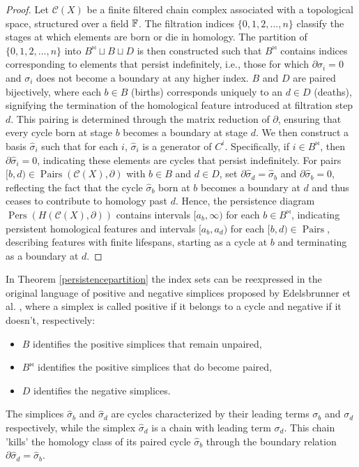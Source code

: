 \begin{proof}
	Let $\mathcal{C}(X)$ be a finite filtered chain complex associated with
	a topological space, structured over a field ${\mathbb{F}}$. The filtration indices $\{0, 1, 2, \ldots, n\}$
	classify the stages at which elements are born or die in homology. The
	partition of $\{0, 1, 2, \ldots, n\}$ into $B^{\Join} \sqcup B \sqcup D$ is then constructed such that $B^{\Join}$ contains indices corresponding to elements that persist indefinitely, i.e., those for which $\partial\sigma_{i} = 0$ and $\sigma_{i}$ does not become a boundary at any higher index. $B$ and $D$ are paired bijectively, where each $b \in B$ (births) corresponds uniquely to an $d \in D$ (deaths), signifying the termination of the homological feature introduced at filtration step $d$. This pairing is determined through the matrix reduction of $\partial$, ensuring that every cycle born at stage $b$ becomes a boundary at stage $d$. We then construct a basis ${\hat{\sigma}_i}$ such that for each $i$, $\hat{\sigma}_{i}$ is a generator of $C^i$. Specifically, if $i \in B^{\Join}$, then
	$\partial\hat{\sigma}_{i} = 0$, indicating these elements are cycles that persist
	indefinitely. For pairs $[b, d) \in \operatorname{Pairs}(\mathcal{C}(X), \partial)$
	with $b \in B$ and $d \in D$, set $\partial\hat{\sigma}_{d} = \hat{\sigma}_{b}$
	and $\partial\hat{\sigma}_{b} = 0$, reflecting the fact that the cycle
	$\hat{\sigma}_{b}$ born at $b$ becomes a boundary at $d$ and thus ceases to
	contribute to homology past $d$. Hence, the persistence diagram $\operatorname{Pers}(H(\mathcal{C}(X), \partial))$ contains
	intervals $[a_{b}, \infty)$ for each $b \in B^{\Join}$, indicating persistent
	homological features and intervals $[a_{b}, a_{d})$ for each
	$[b, d) \in \operatorname{Pairs}$, describing features with finite lifespans,
	starting as a cycle at $b$ and terminating as a boundary at $d$.
\end{proof}

\begin{remark}{\cite[\S 2, p.516]{Edelsbrunner2000}}
In Theorem \ref{persistencepartition} the index sets can be reexpressed in the original language of positive and negative simplices proposed by Edelsbrunner et al. \cite[p.8]{de2011dualities}, where a simplex is called positive if it belongs to a cycle and negative if it doesn't, respectively:
\begin{itemize}
	\item $B$ identifies the positive simplices that remain unpaired,
	\item $B^{\Join}$ identifies the positive simplices that do become paired,
	\item $D$ identifies the negative simplices.
\end{itemize}
The simplices $\hat{\sigma}_{b}$ and $\hat{\sigma}_{d}$ are cycles characterized by
their leading terms $\sigma_{b}$ and $\sigma_{d}$ respectively, while the simplex
$\hat{\sigma}_{d}$ is a chain with leading term $\sigma_{d}$. This chain 'kills'
the homology class of its paired cycle $\hat{\sigma}_{b}$ through the boundary relation
$\partial \hat{\sigma}_{d} = \hat{\sigma}_{b}$.
\end{remark}

